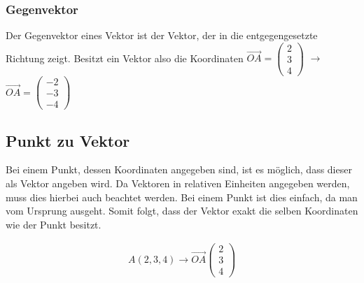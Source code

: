 \subsubsection{Gegenvektor}
Der Gegenvektor eines Vektor ist der Vektor, der in die entgegengesetzte Richtung zeigt. Besitzt ein Vektor also die Koordinaten 
$\vec{OA}=\begin{pmatrix}
	2\\3\\4
\end{pmatrix}$ $\rightarrow$ $\vec{OA}=\begin{pmatrix}
	-2\\-3\\-4
\end{pmatrix}$
\subsection{Punkt zu Vektor}
Bei einem Punkt, dessen Koordinaten angegeben sind, ist es möglich, dass dieser als Vektor angeben wird. Da Vektoren in relativen Einheiten angegeben werden, muss dies hierbei auch beachtet werden. Bei einem Punkt ist dies einfach, da man vom Ursprung ausgeht. Somit folgt, dass der Vektor exakt die selben Koordinaten wie der Punkt besitzt. 

\begin{beispiel}
	\begin{align*}
		A(2,3,4) \rightarrow \vec{OA}\begin{pmatrix}
			2\\3\\4
		\end{pmatrix}
	\end{align*}
\end{beispiel}
\pagebreak
